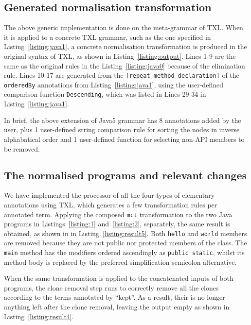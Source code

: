 \documentclass[10pt, conference, compsocconf]{IEEEtran}
\begin{document}
{\subsection{Generated normalisation transformation}
The above generic implementation is done on the meta-grammar of TXL. When it is applied to a concrete TXL grammar, such as the one specified in Listing~\ref{listing:java1}, a concrete normalisation transformation is produced in the original syntax of TXL, as shown in Listing~\ref{listing:output}. Lines 1-9 are the same as the original rules in the Listing~\ref{listing:java0} because of the elimination rule. Lines 10-17 are generated from the {\tt [repeat method\_declaration]} of the {\tt orderedBy} annotations from Listing~\ref{listing:java1}, using the user-defined comparison function {\tt Descending}, which was listed in Lines 29-34 in Listing~\ref{listing:java1}. 


In brief, the above extension of Java5 grammar has 8 annotations added by the user, plus 1 user-defined string comparison rule for sorting the nodes in inverse alphabatical order and 1 user-defined function for selecting non-API members to be removed.
\subsection{The normalised programs and relevant changes}
We have implemented the processor of all the four types of elementary annotations using TXL, which generates a few transformation rules per annotated term. Applying the composed {\tt mct}  transformation to the two Java programs in Listings~\ref{listing:1} and~\ref{listing:2}, separately, the same result is obtained, as shown in in Listing~\ref{listing:result5}. Both {\tt hello} and {\tt world} members are removed because they are not public nor protected members of the class. The {\tt main} method has the modifiers ordered ascendingly as {\tt public static}, whilst its method body is replaced by the preferred simplification semicolon alternative. 

When the same transformation is applied to the concatenated inputs of both programs, the clone removal step runs to correctly remove all the clones according to the terms annotated by ``kept''. As a result, their is no longer anything left after the clone removal, leaving the output empty as shown in Listing~\ref{listing:result4}.



}
\end{document}
